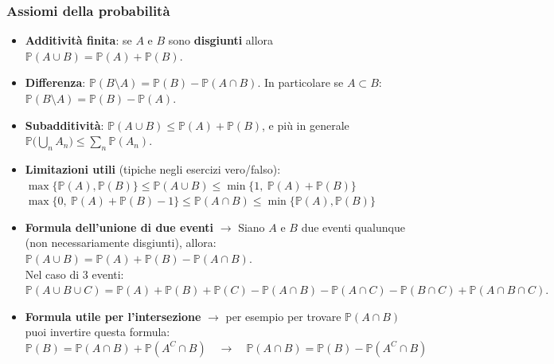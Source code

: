\documentclass[12pt]{extarticle} %
\begin{document}
\subsubsection{Assiomi della probabilità}
\begin{itemize}

    \item \textbf{Additività finita}: se $A$ e $B$ sono \textbf{disgiunti} allora
    $ \mathbb{P}(A \cup B) = \mathbb{P}(A) + \mathbb{P}(B). $

    \item \textbf{Differenza}: $\mathbb{P}(B \setminus A) = \mathbb{P}(B) - \mathbb{P}(A \cap B)$. In particolare se $A \subset B$: $\mathbb{P}(B \setminus A) = \mathbb{P}(B) - \mathbb{P}(A)$.

    \item \textbf{Subadditività}: $\mathbb{P}(A \cup B) \le \mathbb{P}(A) + \mathbb{P}(B)$, e più in generale $\mathbb{P}\big(\bigcup_n A_n\big) \le \sum_n \mathbb{P}(A_n)$.

    \item \textbf{Limitazioni utili} (tipiche negli esercizi vero/falso): \\
    $\max\{\mathbb{P}(A),\mathbb{P}(B)\} \le \mathbb{P}(A \cup B) \le \min\{1,\ \mathbb{P}(A)+\mathbb{P}(B)\}$ \\
    $\max\{0,\ \mathbb{P}(A)+\mathbb{P}(B)-1\} \le \mathbb{P}(A \cap B) \le \min\{\mathbb{P}(A),\mathbb{P}(B)\}$

    \vspace{0.5cm}

    \item \textbf{Formula dell'unione di due eventi} $\to$ Siano $A$ e $B$ due eventi qualunque (non necessariamente disgiunti), allora: \vspace{0.3cm}$ \mathbb{P}(A \cup B) = \mathbb{P}(A) + \mathbb{P}(B) - \mathbb{P}(A \cap B). $ \\ Nel caso di 3 eventi: $ \mathbb{P}(A \cup B \cup C) = \mathbb{P}(A) + \mathbb{P}(B) + \mathbb{P}(C) - \mathbb{P}(A \cap B) - \mathbb{P}(A \cap C) - \mathbb{P}(B \cap C) + \mathbb{P}(A \cap B \cap C). $

    \item \textbf{Formula utile per l'intersezione} $\to$ per esempio per trovare $\mathbb{P}(A \cap B)$ puoi invertire questa formula: $\mathbb{P}(B) = \mathbb{P}(A \cap B) + \mathbb{P}(A^C \cap B) \quad \to \quad  \mathbb{P}(A \cap B) = \mathbb{P}(B) - \mathbb{P}(A^C \cap B) $
\end{itemize}
\end{document}
